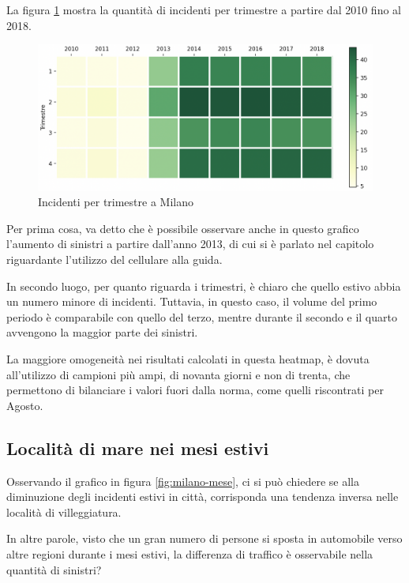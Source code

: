 \documentclass[a4paper,12pt]{report}
\begin{document}
La figura \ref{fig:milano-trimestri} mostra la quantità di incidenti per 
trimestre a partire dal 2010 fino al 2018. 

\begin{figure}
    \includegraphics[width=\linewidth]{../src/incidenti/incidenti_senza_coords/mese_incidenti/trimestri.png}
    \caption{Incidenti per trimestre a Milano}
    \label{fig:milano-trimestri}
\end{figure}

Per prima cosa, va detto che è possibile osservare anche in questo grafico 
l'aumento di sinistri a partire dall'anno 2013, di cui si è parlato nel capitolo 
riguardante l'utilizzo del cellulare alla guida. 

In secondo luogo, per quanto riguarda i trimestri, è chiaro che quello estivo abbia 
un numero minore di incidenti. 
Tuttavia, in questo caso, il volume del primo periodo è comparabile 
con quello del terzo, 
mentre durante il secondo e il quarto avvengono la maggior parte dei sinistri. 

La maggiore omogeneità nei risultati calcolati in questa heatmap, 
è dovuta all'utilizzo di campioni più ampi, di novanta giorni e non di trenta, 
che permettono di bilanciare i valori fuori dalla norma, 
come quelli riscontrati per Agosto. 

\subsection{Località di mare nei mesi estivi}

Osservando il grafico in figura \ref{fig:milano-mese}, 
ci si può chiedere se alla diminuzione degli incidenti estivi in città, 
corrisponda una tendenza inversa nelle località di villeggiatura.

In altre parole, visto che un gran numero di persone si sposta in automobile 
verso altre regioni durante i mesi estivi, la differenza di traffico è osservabile 
nella quantità di sinistri?
\end{document}
